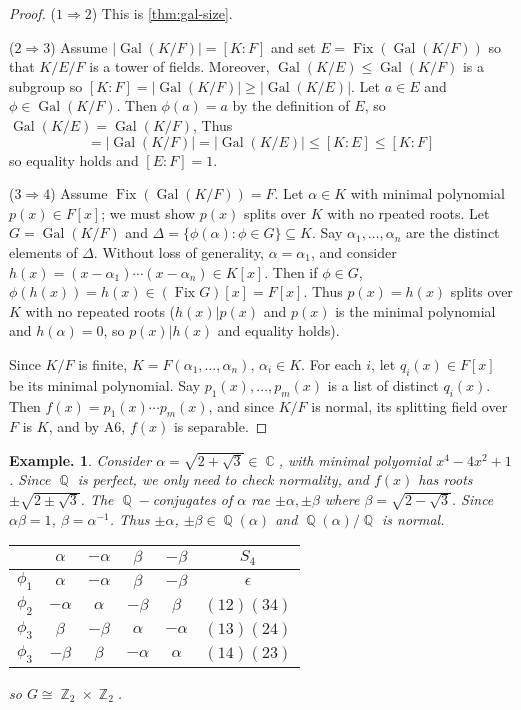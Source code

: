 \documentclass[11pt, a4paper]{memoir}
\DeclareMathOperator{\Q}{{\mathbb{Q}}}
\DeclareMathOperator{\Z}{{\mathbb{Z}}}
\DeclareMathOperator{\C}{{\mathbb{C}}}
\newcommand{\imp}[2]{($#1\Rightarrow#2$)\hspace{0.2cm}}
\theoremstyle{change}
\theoremstyle{plain}
\theoremstyle{nonumberplain}
\newtheorem{example}{Example.}
\newtheorem{proof}{Proof}
\DeclareMathOperator{\Fix}{Fix}
\DeclareMathOperator{\Gal}{Gal}
\numberwithin{equation}{section}
\begin{document}
\begin{proof}
    \imp{1}{2}
    This is \cref{thm:gal-size}.
     
    \imp{2}{3}
    Assume $|\Gal(K/F)|=[K:F]$ and set $E=\Fix(\Gal(K/F))$ so that $K/E/F$ is a tower of fields.
    Moreover, $\Gal(K/E)\leq\Gal(K/F)$ is a subgroup so $[K:F]=|\Gal(K/F)|\geq|\Gal(K/E)|$.
    Let $a\in E$ and $\phi\in\Gal(K/F)$.
    Then $\phi(a)=a$ by the definition of $E$, so $\Gal(K/E)=\Gal(K/F)$,
    Thus
    \begin{equation*}
        [K:F]=|\Gal(K/F)|=|\Gal(K/E)|\leq[K:E]\leq[K:F]
    \end{equation*}
    so equality holds and $[E:F]=1$.

    \imp{3}{4}
    Assume $\Fix(\Gal(K/F))=F$.
    Let $\alpha\in K$ with minimal polynomial $p(x)\in F[x]$; we must show $p(x)$ splits over $K$ with no rpeated roots.
    Let $G=\Gal(K/F)$ and $\Delta=\{\phi(\alpha):\phi\in G\}\subseteq K$.
    Say $\alpha_1,\ldots,\alpha_n$ are the distinct elements of $\Delta$.
    Without loss of generality, $\alpha=\alpha_1$, and consider $h(x)=(x-\alpha_1)\cdots(x-\alpha_n)\in K[x]$.
    Then if $\phi\in G$, $\phi(h(x))=h(x)\in (\Fix G)[x]=F[x]$.
    Thus $p(x)=h(x)$ splits over $K$ with no repeated roots ($h(x)|p(x)$ and $p(x)$ is the minimal polynomial and $h(\alpha)=0$, so $p(x)|h(x)$ and equality holds).

    Since $K/F$ is finite, $K=F(\alpha_1,\ldots,\alpha_n)$, $\alpha_i\in K$.
    For each $i$, let $q_i(x)\in F[x]$ be its minimal polynomial.
    Say $p_1(x),\ldots,p_m(x)$ is a list of distinct $q_i(x)$.
    Then $f(x)=p_1(x)\cdots p_m(x)$, and since $K/F$ is normal, its splitting field over $F$ is $K$, and by A6, $f(x)$ is separable.
\end{proof}
\begin{example}
    Consider $\alpha=\sqrt{2+\sqrt{3}}\in\C$, with minimal polyomial $x^4-4x^2+1$.
    Since $\Q$ is perfect, we only need to check normality, and $f(x)$ has roots $\pm\sqrt{2\pm\sqrt{3}}$.
    The $\Q-$conjugates of $\alpha$ rae $\pm\alpha,\pm\beta$ where $\beta=\sqrt{2-\sqrt{3}}$.
    Since $\alpha\beta=1$, $\beta=\alpha^{-1}$.
    Thus $\pm\alpha$, $\pm\beta\in\Q(\alpha)$ and $\Q(\alpha)/\Q$ is normal.
    \begin{tabular}{c|cccc|c}
        & $\alpha$ & $-\alpha$ & $\beta$ & $-\beta$ & $S_4$\\
        \hline
        $\phi_1$ & $\alpha$ & $-\alpha$ & $\beta$ & $-\beta$ & $\epsilon$\\
        $\phi_2$ & $-\alpha$ & $\alpha$ & $-\beta$ & $\beta$ & $(12)(34)$\\
        $\phi_3$ & $\beta$ & $-\beta$ & $\alpha$ & $-\alpha$ & $(13)(24)$\\
        $\phi_3$ & $-\beta$ & $\beta$ & $-\alpha$ & $\alpha$ & $(14)(23)$
    \end{tabular}
    so $G\cong\Z_2\times\Z_2$.
\end{example}
\end{document}
